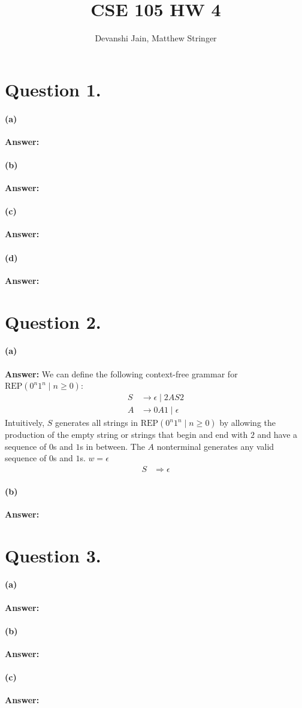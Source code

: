 \documentclass{article}
\title{CSE 105 HW 4}
\author{
    Devanshi Jain, Matthew Stringer 
}
\theoremstyle{definition}
\newcommand{\REP}{\text{REP}}
\renewcommand{\ques}[1]{\section*{Question #1.}}
\begin{document}
    \maketitle
    \ques{1}
    \paragraph{(a)}
        \textbf{Answer: } 
    \paragraph*{(b)}
        \textbf{Answer: }  
    \paragraph*{(c)}
        \textbf{Answer: } 
    \paragraph*{(d)}
        \textbf{Answer: }
    
    \ques{2}
    \paragraph*{(a)}
        \textbf{Answer: } We can define the following context-free 
        grammar for $\REP({0^n1^n \mid n \ge 0})$:
        \begin{align*}
        S &\to \epsilon \mid 2AS2\\
        A &\to 0A1 \mid \epsilon
        \end{align*}
        Intuitively, $S$ generates all strings in 
        $\REP({0^n1^n \mid n \ge 0})$ by allowing the production of 
        the empty string or strings that begin and end with $2$ and 
        have a sequence of $0$s and $1$s in between. The $A$ 
        nonterminal generates any valid sequence of $0$s and $1$s.
        $w = \epsilon$
        \begin{align*}
            S &\Rightarrow \epsilon
        \end{align*}
    \paragraph*{(b)}
        \textbf{Answer: } 

    \ques{3}
    \paragraph*{(a)} 
        \textbf{Answer: } 
    \paragraph*{(b)}
        \textbf{Answer: }
    \paragraph*{(c)}
        \textbf{Answer: }
\end{document}
